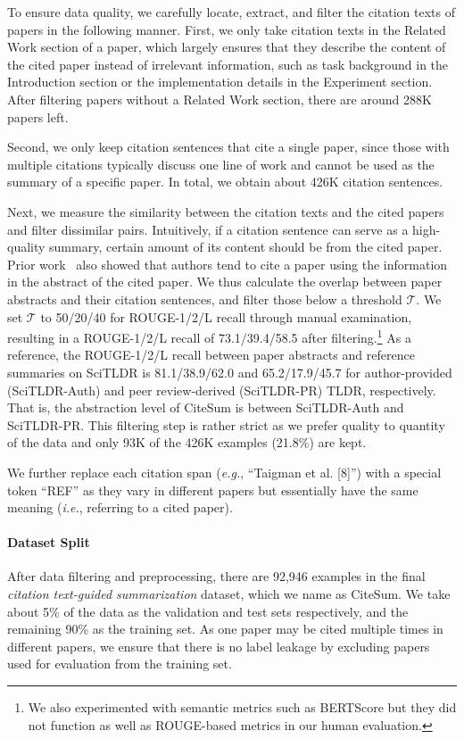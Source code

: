 \documentclass[11pt]{article}
\newcommand{\ie}{\textit{i.e.}} \newcommand{\eg}{\textit{e.g.}} \newcommand{\start}[1]{\vspace{.0mm}\noindent{{\bf #1}.}}
\newcommand{\ourdata}{CiteSum\xspace}
\begin{document}
To ensure data quality, we carefully locate, extract, and filter the citation texts of papers in the following manner.
First, we only take citation texts in the Related Work section of a paper, which largely ensures that they describe the content of the cited paper instead of irrelevant information, such as task background in the Introduction section or the implementation details in the Experiment section.
After filtering papers without a Related Work section, there are around 288K papers left.

Second, we only keep citation sentences that cite a single paper, since those with multiple citations typically discuss one line of work and cannot be used as the summary of a specific paper.
In total, we obtain about 426K citation sentences.



Next, we measure the similarity between the citation texts and the cited papers and filter dissimilar pairs.
Intuitively, if a citation sentence can serve as a high-quality summary, certain amount of its content should be from the cited paper.
Prior work~\cite{lu-etal-2020-multi-xscience} also showed that authors tend to cite a paper using the information in the abstract of the cited paper.
We thus calculate the overlap between paper abstracts and their citation sentences, and filter those below a threshold $\mathcal{T}$.
We set $\mathcal{T}$ to 50/20/40 for ROUGE-1/2/L recall through manual examination, resulting in a ROUGE-1/2/L recall of 73.1/39.4/58.5 after filtering.\footnote{We also experimented with semantic metrics such as BERTScore \cite{zhang2019bertscore} but they did not function as well as ROUGE-based metrics in our human evaluation.}
As a reference, the ROUGE-1/2/L recall between paper abstracts and reference summaries on SciTLDR \cite{cachola-etal-2020-tldr} is 81.1/38.9/62.0 and 65.2/17.9/45.7 for author-provided (SciTLDR-Auth) and peer review-derived (SciTLDR-PR) TLDR, respectively.
That is, the abstraction level of \ourdata is between SciTLDR-Auth and SciTLDR-PR.
This filtering step is rather strict as we prefer quality to quantity of the data and only 93K of the 426K examples (21.8\%) are kept.

We further replace each citation span (\eg, ``Taigman et al. [8]'') with a special token ``REF'' as they vary in different papers but essentially have the same meaning (\ie, referring to a cited paper).

\paragraph{Dataset Split}
After data filtering and preprocessing,  there are 92,946 examples in the final \textit{citation text-guided summarization} dataset, which we name as \ourdata.
We take about 5\% of the data as the validation and test sets respectively, and the remaining 90\% as the training set.
As one paper may be cited multiple times in different papers, we ensure that there is no label leakage by excluding papers used for evaluation from the training set.
\end{document}
